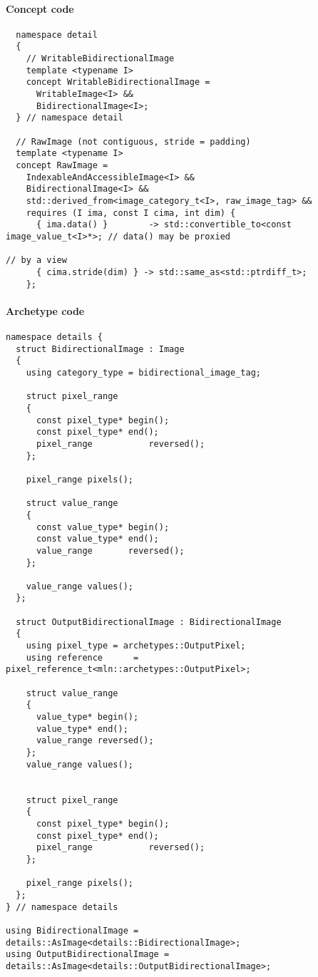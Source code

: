 \paragraph{Concept code}
\begin{verbatim}
  namespace detail
  {
    // WritableBidirectionalImage
    template <typename I>
    concept WritableBidirectionalImage =
      WritableImage<I> &&
      BidirectionalImage<I>;
  } // namespace detail

  // RawImage (not contiguous, stride = padding)
  template <typename I>
  concept RawImage =
    IndexableAndAccessibleImage<I> &&
    BidirectionalImage<I> &&
    std::derived_from<image_category_t<I>, raw_image_tag> &&
    requires (I ima, const I cima, int dim) {
      { ima.data() }        -> std::convertible_to<const image_value_t<I>*>; // data() may be proxied
                                                                             // by a view
      { cima.stride(dim) } -> std::same_as<std::ptrdiff_t>;
    };
\end{verbatim}

\paragraph{Archetype code}

\begin{verbatim}
namespace details {
  struct BidirectionalImage : Image
  {
    using category_type = bidirectional_image_tag;

    struct pixel_range
    {
      const pixel_type* begin();
      const pixel_type* end();
      pixel_range           reversed();
    };

    pixel_range pixels();

    struct value_range
    {
      const value_type* begin();
      const value_type* end();
      value_range       reversed();
    };

    value_range values();
  };

  struct OutputBidirectionalImage : BidirectionalImage
  {
    using pixel_type = archetypes::OutputPixel;
    using reference      = pixel_reference_t<mln::archetypes::OutputPixel>;

    struct value_range
    {
      value_type* begin();
      value_type* end();
      value_range reversed();
    };
    value_range values();


    struct pixel_range
    {
      const pixel_type* begin();
      const pixel_type* end();
      pixel_range           reversed();
    };

    pixel_range pixels();
  };
} // namespace details

using BidirectionalImage = details::AsImage<details::BidirectionalImage>;
using OutputBidirectionalImage = details::AsImage<details::OutputBidirectionalImage>;
\end{verbatim}


